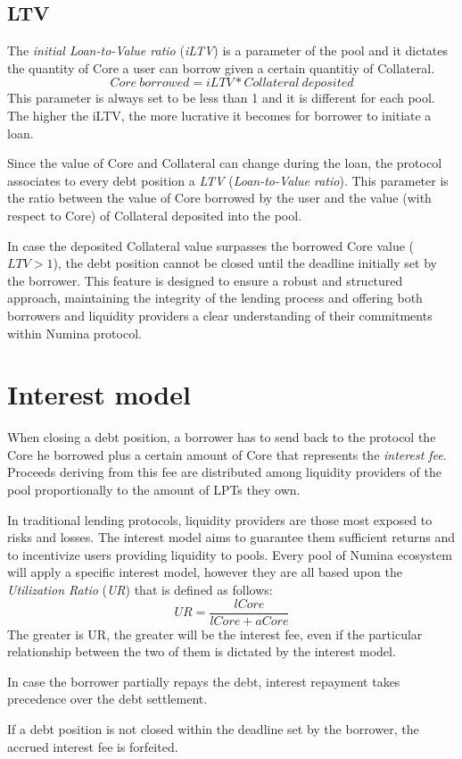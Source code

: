 \documentclass[12pt]{paper}
\begin{document}
	\subsection{LTV}
	\label{subsec:ltv}
		The \textit{initial Loan-to-Value ratio} (\textit{iLTV}) is a parameter of the pool and it dictates the quantity of Core a user can borrow given a certain quantitiy of Collateral.
		\begin{equation}
			Core\ borrowed = iLTV * Collateral\ deposited
		\end{equation}
		This parameter is always set to be less than 1 and it is different for each pool. The higher the iLTV, the more lucrative  it becomes for borrower to initiate a loan.
		\par Since the value of Core and Collateral can change during the loan, the protocol associates to every debt position a \textit{LTV} (\textit{Loan-to-Value ratio}). This parameter is the ratio between the value of Core borrowed by the user and the value (with respect to Core) of Collateral deposited into the pool.
		\par In case the deposited Collateral value surpasses the borrowed Core value ($LTV>1$), the debt position cannot be closed until the deadline initially set by the borrower. This feature is designed to ensure a robust and structured approach, maintaining the integrity of the lending process and offering both borrowers and liquidity providers a clear understanding of their commitments within Numina protocol.
		
\section{Interest model}
\label{sec:interest}
	When closing a debt position, a borrower has to send back to the protocol the Core he borrowed plus a certain amount of Core that represents the \textit{interest fee}. Proceeds deriving from this fee are distributed among liquidity providers of the pool proportionally to the amount of LPTs they own.
	\par In traditional lending protocols, liquidity providers are those most exposed to risks and losses. The interest model aims to guarantee them sufficient returns and to incentivize users providing liquidity to pools. Every pool of Numina ecosystem will apply a specific interest model, however they are all based upon the \textit{Utilization Ratio} (\textit{UR}) that is defined as follows:
	\begin{equation}
		UR = \frac{lCore}{lCore + aCore}
	\end{equation}
	The greater is UR, the greater will be the interest fee, even if the particular relationship between the two of them is dictated by the interest model.
	\par In case the borrower partially repays the debt, interest repayment takes precedence over the debt settlement.
	\par If a debt position is not closed within the deadline set by the borrower, the accrued interest fee is forfeited.
\end{document}
